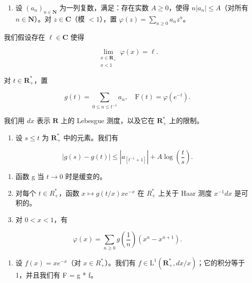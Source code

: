 
\begin{enumerate}
\def\labelenumi{\arabic{enumi})}
\tightlist
\item
  设 \((a_{n})_{n\in \mathbf{N}}\) 为一列复数，满足：存在实数 \(A\geqslant 0\)，使得 \(n|a_n|\leqslant A\)（对所有 \(n\in \mathbf{N}\)）。对 \(z\in \mathbf{C}\)（模 \(<  1\)），置 \(\varphi (z) = \sum_{n\geqslant 0}a_nz^n\)。
\end{enumerate}

我们假设存在 \(\ell \in \mathbf{C}\) 使得

\[
\lim_{\substack{x\in \mathbf{R}_{+}\\ x <   1}}\varphi (x) = \ell .
\]

对 \(t\in \mathbf{R}_+^*\)，置

\[
g (t) = \sum_ {0 \leqslant n \leqslant t ^ {- 1}} a _ {n}, \quad \mathrm{F} (t) = \varphi (e ^ {- t}).
\]

我们用 \(dx\) 表示 \(\mathbf{R}\) 上的 Lebesgue 测度，以及它在 \(\mathbf{R}_{+}^{*}\) 上的限制。

\begin{enumerate}
\def\labelenumi{\alph{enumi})}
\tightlist
\item
  设 \(s \leqslant t\) 为 \(\mathbf{R}_{+}^{*}\) 中的元素。我们有
\end{enumerate}

\[
| g (s) - g (t) | \leqslant | a _ {[ t ^ {- 1} + 1 ]} | + A \log \left(\frac {t}{s}\right).
\]

\begin{enumerate}
\def\labelenumi{\alph{enumi})}
\setcounter{enumi}{1}
\item
  函数 g 当 \(t \rightarrow 0\) 时是缓变的。
\item
  对每个 \(t \in R_{+}^{*}\)，函数 \(x \mapsto g(t/x)xe^{-x}\) 在 \(R_{+}^{*}\) 上关于 Haar 测度 \(x^{-1}dx\) 是可积的。
\item
  对 \(0 < x < 1\)，有
\end{enumerate}

\[
\varphi (x) = \sum_ {n \geqslant 0} g \left(\frac {1}{n}\right) \left(x ^ {n} - x ^ {n + 1}\right).
\]

\begin{enumerate}
\def\labelenumi{\alph{enumi})}
\setcounter{enumi}{4}
\tightlist
\item
  设 \(f(x) = xe^{-x}\)（对 \(x \in R_{+}^{*}\)）。我们有 \(f \in \mathrm{L}^{1}(\mathbf{R}_{+}^{*}, dx/x)\)；它的积分等于 1，并且我们有 F = g * f。
\end{enumerate}

